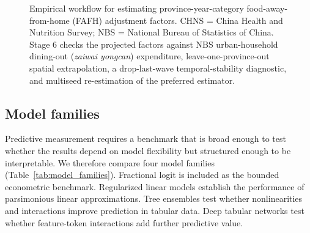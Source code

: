 \documentclass[preprint,12pt,authoryear]{elsarticle}
\begin{document}
\begin{figure}[htbp]
{%
}
\caption{Empirical workflow for estimating province-year-category food-away-from-home (FAFH) adjustment factors. CHNS = China Health and Nutrition Survey; NBS = National Bureau of Statistics of China. Stage 6 checks the projected factors against NBS urban-household dining-out (\textit{zaiwai yongcan}) expenditure, leave-one-province-out spatial extrapolation, a drop-last-wave temporal-stability diagnostic, and multiseed re-estimation of the preferred estimator.}
\label{fig:workflow}
\end{figure}

\subsection{Model families}

Predictive measurement requires a benchmark that is broad enough to test whether the results depend on model flexibility but structured enough to be interpretable. We therefore compare four model families (Table~\ref{tab:model_families}). Fractional logit is included as the bounded econometric benchmark. Regularized linear models establish the performance of parsimonious linear approximations. Tree ensembles test whether nonlinearities and interactions improve prediction in tabular data. Deep tabular networks test whether feature-token interactions add further predictive value.
\end{document}
